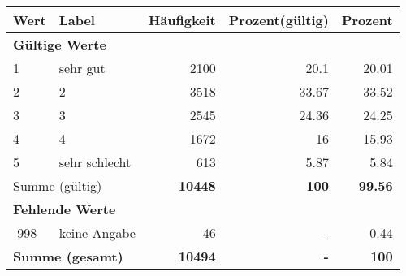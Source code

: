      \begin{longtable}{lXrrr}
     \toprule
     \textbf{Wert} & \textbf{Label} & \textbf{Häufigkeit} & \textbf{Prozent(gültig)} & \textbf{Prozent} \\
     \endhead
     \midrule
     \multicolumn{5}{l}{\textbf{Gültige Werte}}\\

     1 &
     \multicolumn{1}{X}{ sehr gut   } &


       \num{2100} &
       \num[round-mode=places,round-precision=2]{20.1} &
         \num[round-mode=places,round-precision=2]{20.01} \\

     2 &
     \multicolumn{1}{X}{ 2   } &


       \num{3518} &
       \num[round-mode=places,round-precision=2]{33.67} &
         \num[round-mode=places,round-precision=2]{33.52} \\

     3 &
     \multicolumn{1}{X}{ 3   } &


       \num{2545} &
       \num[round-mode=places,round-precision=2]{24.36} &
         \num[round-mode=places,round-precision=2]{24.25} \\

     4 &
     \multicolumn{1}{X}{ 4   } &


       \num{1672} &
       \num[round-mode=places,round-precision=2]{16} &
         \num[round-mode=places,round-precision=2]{15.93} \\

     5 &
     \multicolumn{1}{X}{ sehr schlecht   } &


       \num{613} &
       \num[round-mode=places,round-precision=2]{5.87} &
         \num[round-mode=places,round-precision=2]{5.84} \\
     \midrule
     \multicolumn{2}{l}{Summe (gültig)} &
       \textbf{\num{10448}} &
     \textbf{\num{100}} &
       \textbf{\num[round-mode=places,round-precision=2]{99.56}} \\
     \multicolumn{5}{l}{\textbf{Fehlende Werte}}\\
       -998 &
       keine Angabe &
         \num{46} &
        - &
         \num[round-mode=places,round-precision=2]{0.44} \\
     \midrule
     \multicolumn{2}{l}{\textbf{Summe (gesamt)}} &
          \textbf{\num{10494}} &
        \textbf{-} &
        \textbf{\num{100}} \\
     \bottomrule
     \end{longtable}
     
